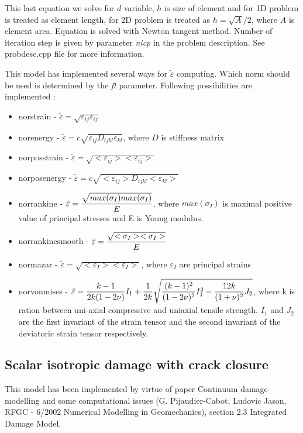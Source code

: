 This last equation we solve for $d$ variable, $h$ is size of element and for 1D problem is treated as element length,
for 2D problem is treated as $h = \sqrt{A}/2$, where $A$ is element area. Equation is solved with Newton tangent method.
Number of iteration step is given by parameter {\it nicp} in the problem description. See probdesc.cpp file for more
information.

This model has implemented several ways for $\tilde{\varepsilon}$ computing. Which norm should be used is determined
by the {\it ft} parameter. Following possibilities are implemented :
\begin{itemize}
\item {\sf norstrain} - $\tilde{\varepsilon}=\sqrt{\varepsilon_{ij} \varepsilon_{ij}}$
\item {\sf norenergy} - $\tilde{\varepsilon}=c\sqrt{\varepsilon_{ij} D_{ijkl} \varepsilon_{kl}}$, where $D$ is stiffness matrix
\item {\sf norposstrain} - $\tilde{\varepsilon}=\sqrt{<\varepsilon_{ij}> <\varepsilon_{ij}>}$
\item {\sf norposenergy} - $\tilde{\varepsilon}=c\sqrt{<\varepsilon_{ij}> D_{ijkl} <\varepsilon_{kl}>}$
\item {\sf norrankine} - $\tilde{\varepsilon}=\mbox{$\displaystyle\frac{\sqrt{max(\sigma_I) max(\sigma_I)}}{E}$}$, where $max(\sigma_I)$ is maximal positive
                         value of principal stresses and E is Young modulus.
\item {\sf norrankinesmooth} - $\tilde{\varepsilon}=\mbox{$\displaystyle\frac{\sqrt{<\sigma_I> <\sigma_I>}}{E}$}$
\item {\sf normazar} - $\tilde{\varepsilon}=\sqrt{<\varepsilon_I> <\varepsilon_I>}$, where $\varepsilon_I$ are principal strains
\item {\sf norvonmises} - $\tilde{\varepsilon} = \mbox{$\displaystyle\frac{k-1}{2k(1-2\nu)}$}I_1+\mbox{$\displaystyle\frac{1}{2k}$}\sqrt{\mbox{$\displaystyle\frac{(k-1)^2}{(1-2\nu)^2}$}I_1^2 -
                           \mbox{$\displaystyle\frac{12k}{(1+\nu)^2}$}J_2}$,
where k is ration between uni-axial compressive and uniaxial tensile strength. $I_1$ and $J_2$ are the first invariant of
the strain tensor and the second invariant of the deviatoric strain tensor respectively.

\end{itemize}

\subsection{Scalar isotropic damage with crack closure}
This model has been implemented by virtue of paper Continuum damage modelling and some computational issues (G. Pijaudier-Cabot,
Ludovic Jason, RFGC - 6/2002 Numerical Modelling in Geomechanics), section 2.3 Integrated Damage Model.


